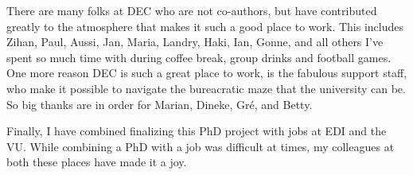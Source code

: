There are many folks at DEC who are not co-authors, but have contributed greatly to the atmosphere that makes it such a good place to work. This includes Zihan, Paul, Aussi, Jan, Maria, Landry, Haki, Ian, Gonne, and all others I've spent so much time with during coffee break, group drinks and football games. One more reason DEC is such a great place to work, is the fabulous support staff, who make it possible to navigate the bureacratic maze that the university can be. So big thanks are in order for Marian, Dineke, Gré, and Betty.

Finally, I have combined finalizing this PhD project with jobs at EDI and the VU. While combining a PhD with a job was difficult at times, my colleagues at both these places have made it a joy.